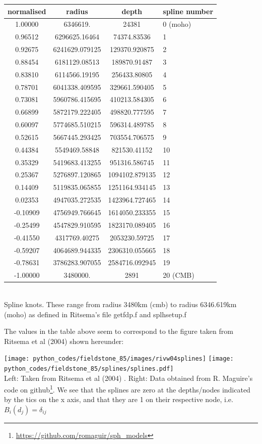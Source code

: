 \begin{center}
\begin{tabular}{cccl}
\hline 
normalised & radius & depth & spline number\\
\hline 
\hline 
1.00000  & 6346619.       &  24381          &0 (moho)\\
0.96512  & 6296625.16464  &  74374.83536    &1\\
0.92675  & 6241629.079125 &  129370.920875  &2\\
0.88454  & 6181129.08513  &  189870.91487   &3\\
0.83810  & 6114566.19195  &  256433.80805   &4\\
0.78701  & 6041338.409595 &  329661.590405  &5\\
0.73081  & 5960786.415695 &  410213.584305  &6\\
0.66899  & 5872179.222405 &  498820.777595  &7\\
0.60097  & 5774685.510215 &  596314.489785  &8\\
0.52615  & 5667445.293425 &  703554.706575  &9\\
0.44384  & 5549469.58848  &  821530.41152   &10\\
0.35329  & 5419683.413255 &  951316.586745  &11\\
0.25367  & 5276897.120865 &  1094102.879135 &12\\
0.14409  & 5119835.065855 &  1251164.934145 &13\\
0.02353  & 4947035.272535 &  1423964.727465 &14\\
-0.10909 & 4756949.766645 &  1614050.233355 &15\\
-0.25499 & 4547829.910595 &  1823170.089405 &16\\
-0.41550 & 4317769.40275  &  2053230.59725  &17\\
-0.59207 & 4064689.944335 &  2306310.055665 &18\\
-0.78631 & 3786283.907055 &  2584716.092945 &19\\
-1.00000 & 3480000.       &  2891           &20  (CMB) \\
\hline
\end{tabular}\\
{\captionfont Spline knots. These range from radius 3480km (cmb) to radius 6346.619km (moho) 
as defined in Ritsema's file getfdp.f and splhsetup.f}
\end{center}

The values in the table above seem to correspond to the figure taken from 
Ritsema et al (2004) \cite{rivw04} shown hereunder: 
\begin{center}
\texttt{[image: python\_codes/fieldstone\_85/images/rivw04splines]}
\texttt{[image: python\_codes/fieldstone\_85/splines/splines.pdf]}\\
{\captionfont Left: Taken from Ritsema et al (2004) \cite{rivw04}.
Right: Data obtained from R. Maguire's code on github\footnote{\url{https://github.com/romaguir/sph_models}}.
We see that the splines are zero at the depths/nodes 
indicated by the tics on the x axis, and that 
they are 1 on their respective node, i.e. $B_i(d_j)=\delta_{ij}$}
\end{center}


